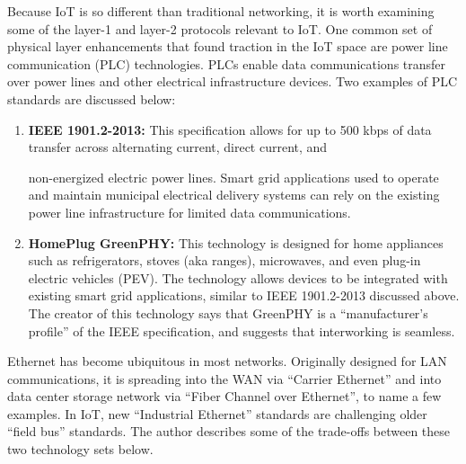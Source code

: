 Because IoT is so different than traditional networking, it is worth examining
some of the layer-1 and layer-2 protocols relevant to IoT. One common set of
physical layer enhancements that found traction in the IoT space are power
line communication (PLC) technologies. PLCs enable data communications
transfer over power lines and other electrical infrastructure devices. Two
examples of PLC standards are discussed below:

\begin{enumerate}
  \item \textbf{IEEE 1901.2-2013:} This specification allows for up to 500
  kbps of data transfer across alternating current, direct current, and

  non-energized electric power lines. Smart grid applications used to operate
  and maintain municipal electrical delivery systems can rely on the existing
  power line infrastructure for limited data communications.
  \item \textbf{HomePlug GreenPHY:} This technology is designed for home
  appliances such as refrigerators, stoves (aka ranges), microwaves, and even
  plug-in electric vehicles (PEV). The technology allows devices to be
  integrated with existing smart grid applications, similar to IEEE
  1901.2-2013 discussed above. The creator of this technology says that
  GreenPHY is a ``manufacturer's profile'' of the IEEE specification, and
  suggests that interworking is seamless.
\end{enumerate}

Ethernet has become ubiquitous in most networks. Originally designed for LAN
communications, it is spreading into the WAN via ``Carrier Ethernet'' and into
data center storage network via ``Fiber Channel over Ethernet'', to name a few
examples. In IoT, new ``Industrial Ethernet'' standards are challenging older
``field bus'' standards. The author describes some of the trade-offs between
these two technology sets below.

